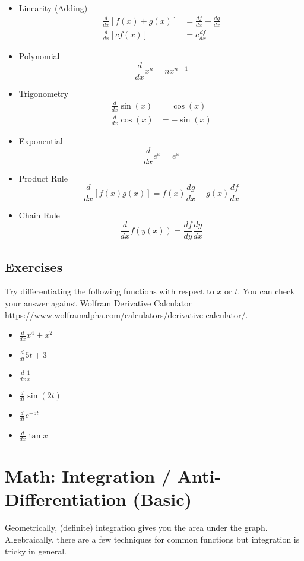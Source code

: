\documentclass{article}
\begin{document}
\begin{itemize}
    \item Linearity (Adding) 
    \begin{align}
        \frac{d}{dx} [f(x) + g(x)] &= \frac{df}{dx} + \frac{dg}{dx} \\
    \frac{d}{dx} [c f(x)] &= c \frac{df}{dx}
    \end{align}
    \item Polynomial $$ \frac{d}{dx} x^n = nx^{n-1} $$
    \item Trigonometry \begin{align}
        \frac{d}{dx} \sin(x) & = \cos(x) \\
        \frac{d}{dx} \cos(x) & = -\sin(x)
    \end{align}
    \item Exponential $$\frac{d}{dx} e^x = e^x$$
    \item Product Rule $$\frac{d}{dx} [f(x) g(x)] = f(x) \frac{dg}{dx} + g(x) \frac{df}{dx}$$
    \item Chain Rule $$\frac{d}{dx} f(y(x)) = \frac{df}{dy} \frac{dy}{dx}$$
\end{itemize}

\subsection{Exercises}
Try differentiating the following functions with respect to $x$ or $t$. You can check your answer against Wolfram Derivative Calculator \url{https://www.wolframalpha.com/calculators/derivative-calculator/}.

\begin{itemize}
    \item $\frac{d}{dx} x^4 + x^2$
    \item $\frac{d}{dt} 5t + 3$
    \item $\frac{d}{dx} \frac{1}{x}$
    \item $\frac{d}{dt} \sin (2t)$
    \item $\frac{d}{dt} e^{-5t}$
    \item $\frac{d}{dx} \tan x$
\end{itemize}

\section{Math: Integration / Anti-Differentiation (Basic)}

Geometrically, (definite) integration gives you the area under the graph. Algebraically, there are a few techniques for common functions but integration is tricky in general. 
\end{document}
